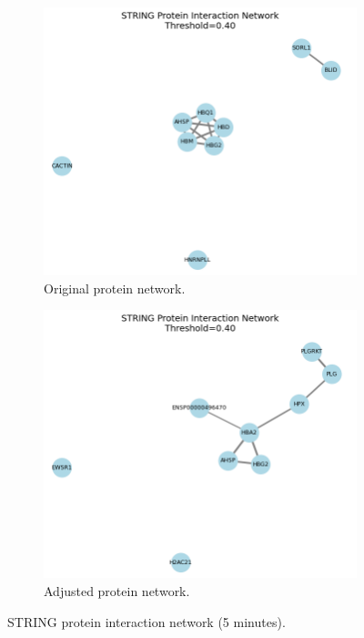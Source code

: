 \documentclass{article}
\begin{document}
      \begin{figure}[H]
        \centering
        \begin{subfigure}{0.45\textwidth}
            \includegraphics[width=\linewidth]{figures/protein_network_5min.png}
            \caption{Original protein network.}
            \label{fig:protein_network_5min}
        \end{subfigure}
        \hfill
        \begin{subfigure}{0.45\textwidth}
            \includegraphics[width=\linewidth]{figures/protein_network_fdr_5min.png}
            \caption{Adjusted protein network.}
            \label{fig:protein_network_fdr_5min}
        \end{subfigure}
        \caption{STRING protein interaction network (5 minutes).}
        \label{fig:protein_network_all_5min}
      \end{figure}
\end{document}
